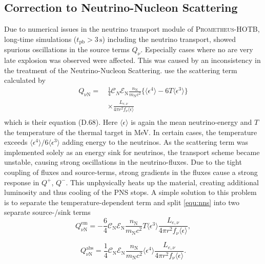 \documentclass[fleqn,usenatbib]{mnras}
\newcommand{\tpb}{\ensuremath{t_{\text{pb}}}}
\newcommand{\s}{\ensuremath{\text{s}}}
\newcommand{\prom}{\textsc{Prometheus-HOTB}\xspace}
\begin{document}
\subsection{Correction to Neutrino-Nucleon Scattering}
Due to numerical issues in the neutrino transport module of \prom, long-time simulations ($\tpb\mathord{>3\,\s}$) including the neutrino transport, showed spurious oscillations in the source terms $Q_{\nu}$. Especially cases where no are very late explosion was observed were affected. 
This was caused by an inconsistency  in the treatment of the Neutrino-Nucleon Scattering.
\cite{Scheck2006} use the scattering term calculated by \cite{Tubbs1979}
\begin{equation}\label{equ:nns}
\begin{aligned}
Q_{\mathrm{\nu N}} = \, & \frac{1}{4} \mathcal{C}_N \mathcal{E}_{\mathrm{N}} \frac{n_{\mathrm{N}}}{m_{\mathrm{N}}c^2}
\{\langle \epsilon^4 \rangle - 6 T\langle \epsilon^3 \rangle  \} \\
& \times  \frac{L_{e,\nu}}{4\pi r^2 f_{\nu}\langle \epsilon \rangle}\\
\end{aligned}
\end{equation}
which is their equation (D.68). Here $\langle \epsilon \rangle$ is again the mean neutrino-energy and $T$ the temperature of the thermal target in MeV.
In certain cases, the temperature exceeds $\langle \epsilon^4 \rangle / 6 \langle \epsilon^3 \rangle $ adding energy to the neutrinos. As the scattering term was implemented solely as an energy sink for neutrinos, the transport scheme became unstable, causing strong oscillations in the neutrino-fluxes. Due to the tight coupling of fluxes and source-terms, strong gradients in the fluxes cause a strong response in $Q^+$, $Q^-$. This unphysically heats up the material, creating additional luminosity and thus cooling of the PNS stops.
A simple solution to this problem is to separate the temperature-dependent term and split \ref{equ:nns} into two separate source-/sink terms
\begin{equation}\label{equ:nns1}
Q^{\mathrm{em}}_{\nu \mathrm{N}} = - \frac{6}{4} \mathcal{C}_{\mathrm{N}} \mathcal{E}_{\mathrm{N}} \frac{n_{\mathrm{N}}}{m_{\mathrm{N}}c^2}
T \langle \epsilon^3 \rangle \frac{L_{e,\nu}}{4\pi r^2 f_{\nu}\langle \epsilon \rangle},
\end{equation}

\begin{equation}\label{equ:nns2}
Q^{\mathrm{abs}}_{\nu \mathrm{N}} = \frac{1}{4} \mathcal{C}_{\mathrm{N}} \mathcal{E}_{\mathrm{N}} \frac{n_{\mathrm{N}}}{m_{\mathrm{N}}c^2}
\langle \epsilon^4 \rangle \frac{L_{e,\nu}}{4\pi r^2 f_{\nu}\langle \epsilon \rangle}.
\end{equation}
\end{document}
